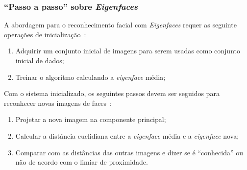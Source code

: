 \subsubsection{``Passo a passo'' sobre \textit{Eigenfaces}}

A abordagem para o reconhecimento facial com \textit{Eigenfaces} requer as seguinte operações de inicialização~\cite{turk}:

	\begin{enumerate}
		\item Adquirir um conjunto inicial de imagens para serem usadas como conjunto inicial de dados;
		\item Treinar o algoritmo calculando a \textit{eigenface} média;
	\end{enumerate}

Com o sistema inicializado, os seguintes passos devem ser seguidos para reconhecer novas imagens de faces~\cite{turk}:
	
	\begin{enumerate}
		\item Projetar a nova imagem na componente principal;
		\item Calcular a distância euclidiana entre a \textit{eigenface} média e a \textit{eigenface} nova;
		\item Comparar com as distâncias das outras imagens e dizer se é ``conhecida'' ou não de acordo com o limiar de proximidade.
	\end{enumerate}